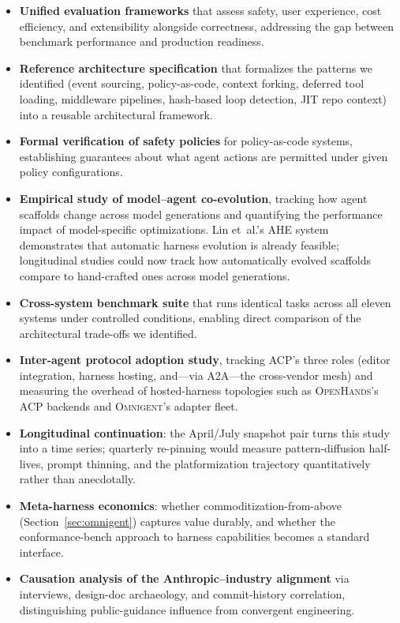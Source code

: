\documentclass[11pt,a4paper]{article}
\newcommand{\oh}{\textsc{OpenHands}\xspace}
\newcommand{\omni}{\textsc{Omnigent}\xspace}
\begin{document}
\begin{itemize}[itemsep=2pt]
  \item \textbf{Unified evaluation frameworks} that assess safety, user experience, cost efficiency, and extensibility alongside correctness, addressing the gap between benchmark performance and production readiness.

  \item \textbf{Reference architecture specification} that formalizes the patterns we identified (event sourcing, policy-as-code, context forking, deferred tool loading, middleware pipelines, hash-based loop detection, JIT repo context) into a reusable architectural framework.

  \item \textbf{Formal verification of safety policies} for policy-as-code systems, establishing guarantees about what agent actions are permitted under given policy configurations.

  \item \textbf{Empirical study of model--agent co-evolution}, tracking how agent scaffolds change across model generations and quantifying the performance impact of model-specific optimizations. Lin et~al.'s AHE system~\cite{lin2026ahe} demonstrates that automatic harness evolution is already feasible; longitudinal studies could now track how automatically evolved scaffolds compare to hand-crafted ones across model generations.

  \item \textbf{Cross-system benchmark suite} that runs identical tasks across all eleven systems under controlled conditions, enabling direct comparison of the architectural trade-offs we identified.

  \item \textbf{Inter-agent protocol adoption study}, tracking ACP's three roles (editor integration, harness hosting, and---via A2A---the cross-vendor mesh) and measuring the overhead of hosted-harness topologies such as \oh{}'s ACP backends and \omni{}'s adapter fleet.

  \item \textbf{Longitudinal continuation}: the April/July snapshot pair turns this study into a time series; quarterly re-pinning would measure pattern-diffusion half-lives, prompt thinning, and the platformization trajectory quantitatively rather than anecdotally.

  \item \textbf{Meta-harness economics}: whether commoditization-from-above (Section~\ref{sec:omnigent}) captures value durably, and whether the conformance-bench approach to harness capabilities becomes a standard interface.

  \item \textbf{Causation analysis of the Anthropic--industry alignment} via interviews, design-doc archaeology, and commit-history correlation, distinguishing public-guidance influence from convergent engineering.
\end{itemize}
\end{document}
